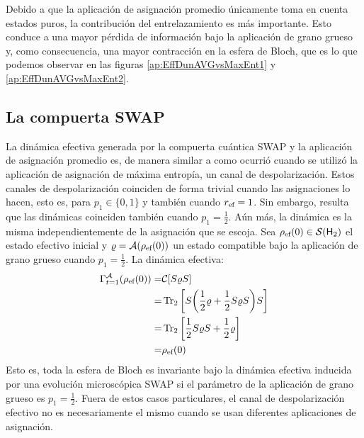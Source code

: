 Debido a que la aplicación de asignación promedio únicamente toma en cuenta estados puros, la contribución del entrelazamiento es más importante. Esto conduce a una mayor pérdida de información bajo la aplicación de grano grueso y, como consecuencia, una mayor contracción en la esfera de Bloch, que es lo que podemos observar en las figuras \ref{ap:EffDunAVGvsMaxEnt1} y \ref{ap:EffDunAVGvsMaxEnt2}.

\subsection{La compuerta SWAP}

La dinámica efectiva generada por la compuerta cuántica SWAP y la aplicación de asignación promedio es, de manera similar a como ocurrió cuando se utilizó la aplicación de asignación de máxima entropía, un canal de despolarización. Estos canales de despolarización coinciden de forma trivial cuando las asignaciones lo hacen, esto es, para $p_{1}\in\{0,1\}$ y también cuando $r_{\text{ef}}=1$. Sin embargo, resulta que las dinámicas coinciden también cuando $p_{1}=\frac{1}{2}$. Aún más, la dinámica es la misma independientemente de la asignación que se escoja. Sea $\rho_{\text{ef}}(0)\in\mathcal{S}({\sf H}_{2})$ el estado efectivo inicial y $\varrho=\mathcal{A}(\rho_{\text{ef}}(0))$ un estado compatible bajo la aplicación de grano grueso cuando $p_{1}=\frac{1}{2}$. La dinámica efectiva:
\begin{align}
  \Gamma_{t=1}^{\mathcal{A}}(\rho_{\text{ef}}(0))=&\mathcal{C}\qty[S\varrho S]\nonumber\\
  =&\Tr_{2}\qty[S\qty(\frac{1}{2}\varrho+\frac{1}{2}S\varrho S)S]\nonumber\\
  =&\Tr_{2}\qty[\frac{1}{2}S\varrho S+\frac{1}{2}\varrho ]\nonumber\\
  =&\rho_{\text{ef}}(0)\nonumber
\end{align}
Esto es, toda la esfera de Bloch es invariante bajo la dinámica efectiva inducida por una evolución microscópica SWAP si el parámetro de la aplicación de grano grueso es $p_{1}=\frac{1}{2}$. Fuera de estos casos particulares, el canal de despolarización efectivo no es necesariamente el mismo cuando se usan diferentes aplicaciones de asignación.

